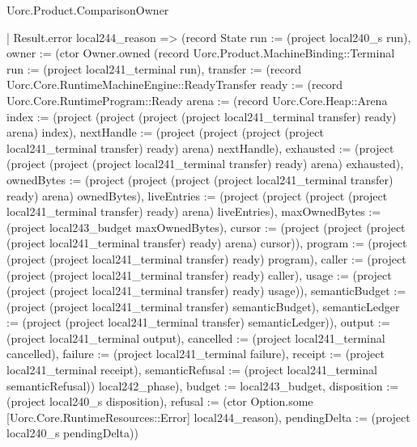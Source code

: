 \begin{lexlean}{Uorc.Product.ComparisonOwner}
\begin{semanticmodule}
{    | Result.error local244_reason => (record State {run := (project local240_s run), owner := (ctor Owner.owned (record Uorc.Product.MachineBinding::Terminal {run := (project local241_terminal run), transfer := (record Uorc.Core.RuntimeMachineEngine::ReadyTransfer {ready := (record Uorc.Core.RuntimeProgram::Ready {arena := (record Uorc.Core.Heap::Arena {index := (project (project (project (project local241_terminal transfer) ready) arena) index), nextHandle := (project (project (project (project local241_terminal transfer) ready) arena) nextHandle), exhausted := (project (project (project (project local241_terminal transfer) ready) arena) exhausted), ownedBytes := (project (project (project (project local241_terminal transfer) ready) arena) ownedBytes), liveEntries := (project (project (project (project local241_terminal transfer) ready) arena) liveEntries), maxOwnedBytes := (project local243_budget maxOwnedBytes), cursor := (project (project (project (project local241_terminal transfer) ready) arena) cursor)}), program := (project (project (project local241_terminal transfer) ready) program), caller := (project (project (project local241_terminal transfer) ready) caller), usage := (project (project (project local241_terminal transfer) ready) usage)}), semanticBudget := (project (project local241_terminal transfer) semanticBudget), semanticLedger := (project (project local241_terminal transfer) semanticLedger)}), output := (project local241_terminal output), cancelled := (project local241_terminal cancelled), failure := (project local241_terminal failure), receipt := (project local241_terminal receipt), semanticRefusal := (project local241_terminal semanticRefusal)}) local242_phase), budget := local243_budget, disposition := (project local240_s disposition), refusal := (ctor Option.some [Uorc.Core.RuntimeResources::Error] local244_reason), pendingDelta := (project local240_s pendingDelta)})
}
\end{semanticmodule}
\end{lexlean}
